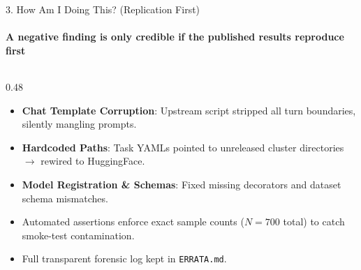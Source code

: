 \documentclass[aspectratio=169, 10pt]{beamer}
\begin{document}
\begin{frame}{3. How Am I Doing This? (Replication First)}
  \framesubtitle{A negative finding is only credible if the published results reproduce first}
  
  \begin{columns}[T]
    \begin{column}{0.48\textwidth}
      \begin{tcolorbox}[metriccard, title=\textbf{1. Fixed 5 Upstream Codebase Bugs}]
        \scriptsize
        \begin{itemize}\setlength{\itemsep}{2pt}
          \item \textbf{Chat Template Corruption}: Upstream script stripped all turn boundaries, silently mangling prompts.
          \item \textbf{Hardcoded Paths}: Task YAMLs pointed to unreleased cluster directories $\rightarrow$ rewired to HuggingFace.
          \item \textbf{Model Registration \& Schemas}: Fixed missing decorators and dataset schema mismatches.
        \end{itemize}
      \end{tcolorbox}
      \vspace{4pt}
      \begin{tcolorbox}[successcard, title=\textbf{2. Rigorous Data Integrity Controls}]
        \scriptsize
        \begin{itemize}\setlength{\itemsep}{2pt}
          \item Automated assertions enforce exact sample counts ($N=700$ total) to catch smoke-test contamination.
          \item Full transparent forensic log kept in \texttt{ERRATA.md}.
        \end{itemize}
      \end{tcolorbox}
    \end{column}
    

\end{columns}
\end{frame}
\end{document}
